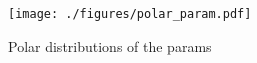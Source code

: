 \documentclass[11pt,a4paper,openany]{report}
\begin{document}
\begin{figure}[H]
    \centering
    \texttt{[image: ./figures/polar\_param.pdf]}
    \caption{Polar distributions of the params}
    \label{}
\end{figure}

\begin{multicols}{2}
    \newpage
    \nocite{*}
    \printbibliography
\end{multicols}
\end{document}
